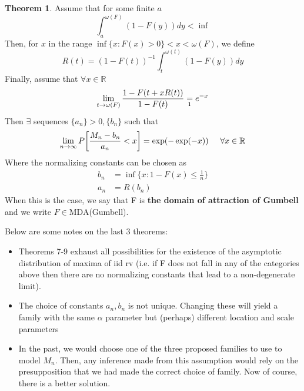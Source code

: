 \documentclass{article}
\theoremstyle{definition}
\newtheorem{theorem}{Theorem}
\theoremstyle{definition}
\def\inv{^{-1}}
\def\w{\omega}
\begin{document}
\begin{theorem}
Assume that for some finite $a$
\[\int_a^{\w(F)} (1-F(y))dy < \inf\]
Then, for $x$ in the range $\inf\{x:F(x)>0\}<x<\w(F)$, we define 
\[R(t)= (1-F(t))\inv \int_t^{\w(t)} (1-F(y))dy\]
Finally, assume that $\forall x \in \mathbb{R}$
\[\lim_{t\rightarrow \w(F)} \frac{1-F(t+xR(t))}{1-F(t)}\underset{\footnotemark}{=}e^{-x}\]
Then $\exists$ sequences $\{a_n\}>0,\{b_n\}$ such that 
\[\lim_{n\rightarrow \infty}P \bigg[ \frac{M_n-b_n}{a_n} < x\bigg]=\exp(-\exp(-x)) \hspace{0.5 cm} \forall x\in \mathbb{R}\]
Where the normalizing constants can be chosen as 
\begin{align*}
    b_n&=\inf\{x:1-F(x)\leq \frac{1}{n}\}\\
    a_n&=R(b_n)
\end{align*}
When this is the case, we say that F is \textbf{the domain of attraction of Gumbell} and we write $F\in $MDA(Gumbell).

\end{theorem}

Below are some notes on the last 3 theorems:
\begin{itemize}
    \item Theorems 7-9 exhaust all possibilities for the existence of the asymptotic distribution of maxima of iid rv (i.e. if F does not fall in any of the categories above then there are no normalizing constants that lead to a non-degenerate limit).
    \item The choice of constants $a_n,b_n$ is not unique. Changing these will yield a family with the same $\alpha$ parameter but (perhaps) different location and scale parameters
    \item In the past, we would choose one of the three proposed families to use to model $M_n$. Then, any inference made from this assumption would rely on the presupposition that we had made the correct choice of family. Now of course, there is a better solution.
\end{itemize}
\end{document}
